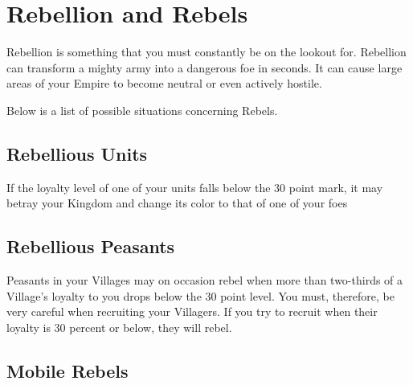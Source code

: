 
\chapter{Rebellion and Rebels}

Rebellion is something that you must constantly be on the lookout for. Rebellion can transform a mighty army into a dangerous foe in seconds. It can cause large areas of your Empire to become neutral or even actively hostile.

Below is a list of possible situations concerning Rebels.

\section{Rebellious Units}

If the loyalty level of one of your units falls below the 30 point mark, it may betray your Kingdom and change its color to that of one of your foes

\section{Rebellious Peasants}

Peasants in your Villages may on occasion rebel when more than two-thirds of a Village’s loyalty to you drops below the 30 point level. You must, therefore, be very careful when recruiting your Villagers. If you try to recruit when their loyalty is 30 percent or below, they will rebel.

\section{Mobile Rebels}

